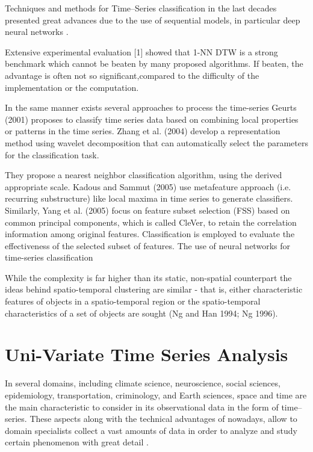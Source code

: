 Techniques and methods for Time--Series classification in the last decades presented great advances due to the use of sequential models, in particular deep neural networks \cite{Fawaz2019}. 

Extensive  experimental  evaluation  [1] showed  that  1-NN  DTW  is  a  strong  benchmark  which  cannot  be  beaten  by many proposed algorithms. If beaten, the advantage is often not so significant,compared to the difficulty of the implementation or the computation.

In the same manner exists several approaches to process the time-series Geurts (2001) proposes to classify time series data based on combining local properties or patterns in the time series. Zhang et al. (2004) develop a representation method using wavelet decomposition that can automatically select the parameters for the classification task. 

They propose a nearest neighbor classification algorithm, using the derived appropriate scale. Kadous and Sammut (2005) use metafeature approach (i.e. recurring substructure) like local maxima in time series to generate classifiers. Similarly, Yang et al. (2005) focus on feature subset selection (FSS) based on common principal components, which is called CleVer, to retain the correlation information among original features. Classification is employed to evaluate the effectiveness of the selected subset of features. 
The use of neural networks for time-series classification

 While the complexity is far higher than its static, non-spatial counterpart the ideas behind spatio-temporal clustering are similar - that is, either characteristic features of objects in a spatio-temporal region or the spatio-temporal characteristics of a set of objects are sought (Ng and Han 1994; Ng 1996).

\section{Uni-Variate Time Series Analysis}
\label{Sec:TSAnalysis}

In several domains, including climate science, neuroscience, social sciences, epidemiology, transportation, criminology, and Earth sciences, space and time are the main characteristic to consider in its observational data in the form of time--series. These aspects along with the technical advantages of nowadays, allow to domain specialists collect a vast amounts of data in order to analyze and study certain phenomenon with great detail \cite{}. 


